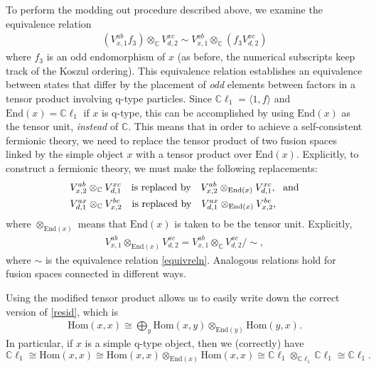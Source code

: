 \documentclass[12pt,a4paper]{article}
\newcommand{\tp}{\otimes}
\newcommand{\cc}{\mathbb{C}}
\newcommand\be            {\begin{equation}}
\newcommand\ee            {\end{equation}}
\newcommand\ba            {\begin{aligned}}
\newcommand\ea            {\end{aligned}}
\newcommand{\Hom}{\text{Hom}}
\newcommand{\End}{\text{End}}
\newcommand{\cl}{\mathbb{C}\ell}
\begin{document}
To perform the modding out procedure described above, we examine the 
equivalence relation 
\begin{align} \label{equivreln}
(V^{ab}_{x,1} f_3) \tp_{\mathbb{C}}V^{xc}_{d,2} \sim V^{ab}_{x,1} \tp_{\mathbb{C}} (f_3 V^{xc}_{d,2})
\end{align}
where $f_3$ is an odd endomorphism of $x$ (as before, the numerical subscripts keep track of the Koszul ordering).
This equivalence relation establishes an equivalence between states that differ by the placement of {\it odd} elements between factors in a tensor product involving q-type particles. 
Since $\cl_1 = \langle1,f\rangle$ and $\End(x) = \cl_1$ if $x$ is q-type, this can be accomplished by using $\End(x)$ as the tensor unit, {\it instead} of $\cc$. 
This means that in order to achieve a self-consistent fermionic theory, we need to replace the tensor product of two fusion spaces linked by the simple object $x$ with a tensor product over $\End(x)$. 
 Explicitly, to construct a fermionic theory, we must make the following replacements:
\be \ba
 &V^{ab}_{x,2} \tp_{\mathbb{C}} V^{xc}_{d,1}\quad  \text{is replaced by} \quad V^{ab}_{x,2} \tp_{\text{End}(x)} V^{xc}_{d,1},\ \  {\rm and} \\ 
  &V^{ax}_{d,1} \tp_{\mathbb{C}} V^{bc}_{x,2}\quad  \text{is replaced by} \quad V^{ax}_{d,1} \tp_{\End(x)} V^{bc}_{x,2},
\ea 
\ee
where $\tp_{\End(x)}$ means that $\End(x)$ is taken to be the tensor unit. Explicitly, 
\begin{align}
V^{ab}_{x,1} \tp_{\text{End}(x)} V^{xc}_{d,2} = V^{ab}_{x,1} \tp_{\mathbb{C}}V^{xc}_{d,2}/ \sim,
\label{qtensor}
\end{align}
where $\sim$ is the equivalence relation \eqref{equivreln}. 
Analogous relations hold for fusion spaces connected in different ways. 

Using the modified tensor product allows us to easily write down the correct version of \eqref{resid}, which is 
\begin{align}
\Hom(x,x) \cong \bigoplus_y \Hom(x,y) \tp_{\End(y)} \Hom(y,x).
\end{align}
In particular, if $x$ is a simple q-type object, then we (correctly) have \be
\cl_1 \cong \Hom(x,x) \cong \Hom(x,x)\tp_{\End(x)} \Hom(x,x) \cong \cl_1\tp_{\cl_1}\cl_1 \cong \cl_1.\ee  
\end{document}
